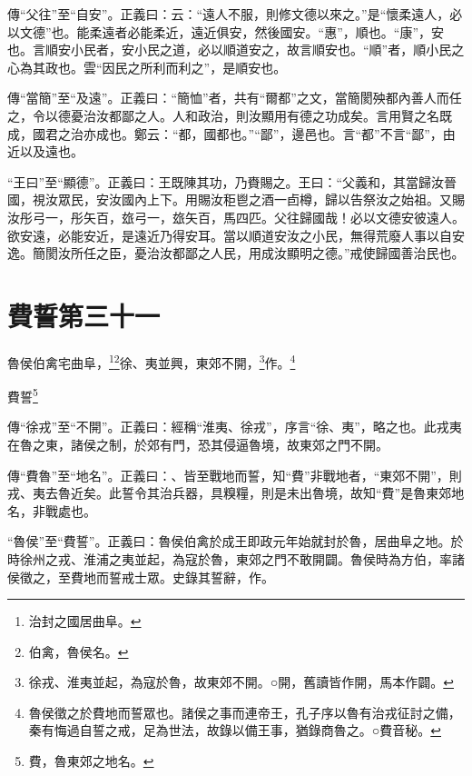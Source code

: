 {\noindent\zhuan{}\fzbyks 傳“父往”至“自安”。正義曰：云：“遠人不服，則修文德以來之。”是“懷柔遠人，必以文德”也。能柔遠者必能柔近，遠近俱安，然後國安。“惠”，順也。“康”，安也。言順安小民者，安小民之道，必以順道安之，故言順安也。“順”者，順小民之心為其政也。雲“因民之所利而利之”，是順安也。 \par}

{\noindent\zhuan{}\fzbyks 傳“當簡”至“及遠”。正義曰：“簡恤”者，共有“爾都”之文，當簡閡殃都內善人而任之，令以德憂治汝都鄙之人。人和政治，則汝顯用有德之功成矣。言用賢之名既成，國君之治亦成也。鄭云：“都，國都也。”“鄙”，邊邑也。言“都”不言“鄙”，由近以及遠也。 \par}

{\noindent\shu{}\fzkt “王曰”至“顯德”。正義曰：王既陳其功，乃賚賜之。王曰：“父義和，其當歸汝晉國，視汝眾民，安汝國內上下。用賜汝秬鬯之酒一卣樽，歸以告祭汝之始祖。又賜汝彤弓一，彤矢百，玈弓一，玈矢百，馬四匹。父往歸國哉！必以文德安彼遠人。欲安遠，必能安近，是遠近乃得安耳。當以順道安汝之小民，無得荒廢人事以自安逸。簡閡汝所任之臣，憂治汝都鄙之人民，用成汝顯明之德。”戒使歸國善治民也。 \par}

\section{費誓第三十一}


魯侯伯禽宅曲阜，\footnote{治封之國居曲阜。}\footnote{伯禽，魯侯名。}徐、夷並興，東郊不開，\footnote{徐戎、淮夷並起，為寇於魯，故東郊不開。○開，舊讀皆作開，馬本作闢。}作。\footnote{魯侯徵之於費地而誓眾也。諸侯之事而連帝王，孔子序以魯有治戎征討之備，秦有悔過自誓之戒，足為世法，故錄以備王事，猶錄商魯之。○費音秘。}

費誓\footnote{費，魯東郊之地名。}


{\noindent\zhuan{}\fzbyks 傳“徐戎”至“不開”。正義曰：經稱“淮夷、徐戎”，序言“徐、夷”，略之也。此戎夷在魯之東，諸侯之制，於郊有門，恐其侵逼魯境，故東郊之門不開。 \par}

{\noindent\zhuan{}\fzbyks 傳“費魯”至“地名”。正義曰：、皆至戰地而誓，知“費”非戰地者，“東郊不開”，則戎、夷去魯近矣。此誓令其治兵器，具糗糧，則是未出魯境，故知“費”是魯東郊地名，非戰處也。 \par}

{\noindent\shu{}\fzkt “魯侯”至“費誓”。正義曰：魯侯伯禽於成王即政元年始就封於魯，居曲阜之地。於時徐州之戎、淮浦之夷並起，為寇於魯，東郊之門不敢開闢。魯侯時為方伯，率諸侯徵之，至費地而誓戒士眾。史錄其誓辭，作。 \par}

